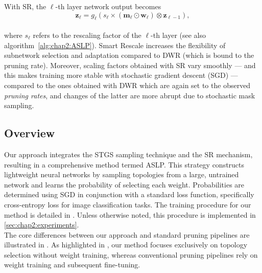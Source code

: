 With SR, the $\ell$-th layer network output becomes \\

  \begin{equation}
   \mathbf{z}_{\ell} = g_\ell(s_\ell \times (\bm{m}_\ell \odot \bm{w}_\ell) \otimes \mathbf{z}_{\ell-1}),
  \end{equation}\\

\noindent where $s_\ell$ refers to the rescaling factor  of the $\ell$-th
layer (see also algorithm~\ref{alg:chap2:ASLP}). Smart Rescale increases
the flexibility of subnetwork selection and adaptation compared to DWR (which
is bound to the pruning rate). Moreover, scaling factors obtained with SR
vary smoothly --- and this makes training more stable with stochastic
gradient descent (SGD) --- compared to the ones obtained with DWR which are
again set to the observed {\it pruning rates}, and changes of the latter are
more abrupt due to stochastic mask sampling. \\



\subsection{Overview}
Our approach integrates the \acl{STGS} sampling technique and the \acl{SR}
mechanism, resulting in a comprehensive method termed \acf{ASLP}. This strategy
constructs lightweight neural networks by sampling topologies from a large,
untrained network and learns the probability of selecting each weight.
Probabilities are determined using \acl{SGD} in conjunction with a standard loss
function, specifically cross-entropy loss for image classification tasks. The
training procedure for our method is detailed in . Unless
otherwise noted, this procedure is implemented in
\cref{sec:chap2:experiments}.\\

The core differences between our approach and standard pruning pipelines are
illustrated in . As
highlighted in , our method focuses exclusively on
topology selection without weight training, whereas conventional pruning
pipelines rely on weight training and subsequent fine-tuning.\\



